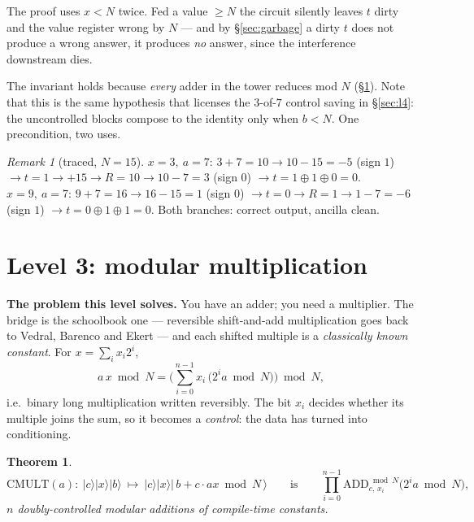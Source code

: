 \documentclass[11pt]{article}
\renewcommand{\ket}[1]{\lvert #1 \rangle}
\newcommand{\ADD}{\mathrm{ADD}}
\newcommand{\CMULT}{\mathrm{CMULT}}
\theoremstyle{plain}
\newtheorem{theorem}{Theorem}[section]
\theoremstyle{remark}
\newtheorem*{remark}{Remark}
\begin{document}
\begin{warnbox}[title={The precondition is load-bearing}]
The proof uses $x<N$ twice. Fed a value $\ge N$ the circuit silently leaves $t$ dirty and the value
register wrong by $N$ --- and by \S\ref{sec:garbage} a dirty $t$ does not produce a wrong answer,
it produces \emph{no} answer, since the interference downstream dies.

The invariant holds because \emph{every} adder in the tower reduces mod $N$ (\S\ref{sec:l3}). Note
that this is the same hypothesis that licenses the $3$-of-$7$ control saving in \S\ref{sec:l4}: the
uncontrolled blocks compose to the identity only when $b<N$. One precondition, two uses.
\end{warnbox}

\begin{remark}[traced, $N=15$]
$x=3,\ a=7$: $3{+}7{=}10\to10{-}15{=}-5$ (sign $1$) $\to t{=}1\to+15\to R{=}10\to10{-}7{=}3$
(sign $0$) $\to t=1\oplus1\oplus0=0$. \quad
$x=9,\ a=7$: $9{+}7{=}16\to16{-}15{=}1$ (sign $0$) $\to t{=}0\to R{=}1\to1{-}7{=}-6$ (sign $1$)
$\to t=0\oplus1\oplus1=0$. Both branches: correct output, ancilla clean.
\end{remark}

\section{Level 3: modular multiplication}\label{sec:l3}

\textbf{The problem this level solves.} You have an adder; you need a multiplier. The bridge is the
schoolbook one --- reversible shift-and-add multiplication goes back to Vedral, Barenco and Ekert
\cite{vbe} --- and each shifted multiple is a \emph{classically known constant}. For
$x=\sum_i x_i2^i$,
\begin{equation}\label{eq:shiftadd}
a\,x\bmod N=\Big(\sum_{i=0}^{n-1}x_i\,\big(2^ia\bmod N\big)\Big)\bmod N ,
\end{equation}
i.e.\ binary long multiplication written reversibly. The bit $x_i$ decides whether its multiple
joins the sum, so it becomes a \emph{control}: the data has turned into conditioning.

\begin{theorem}\label{thm:cmult}
\[
\CMULT(a):\ \ket c\ket x\ket b\ \mapsto\ \ket c\ket x\ket{\,b+c\cdot ax\bmod N\,}
\qquad\text{is}\qquad
\prod_{i=0}^{n-1}\ADD^{\bmod N}_{c,\,x_i}\!\big(2^ia\bmod N\big),
\]
$n$ doubly-controlled modular additions of compile-time constants.
\end{theorem}
\end{document}
